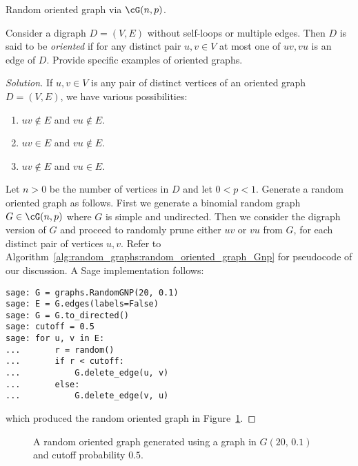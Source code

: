 \begin{algorithm}[!htbp]

\caption{Random oriented graph via $\cG(n,p)$.}
\label{alg:random_graphs:random_oriented_graph_Gnp}
\end{algorithm}

\begin{example}
\label{eg:random_graphs:random_oriented_graph}
Consider a digraph $D = (V,E)$ without self-loops or multiple
edges. Then $D$ is said to be \emph{oriented} if
for any distinct pair $u,v \in V$ at most one of $uv, vu$ is an edge
of $D$. Provide specific examples of oriented graphs.
\end{example}

\begin{proof}[Solution]
If $u,v \in V$ is any pair of distinct vertices of an oriented graph
$D = (V,E)$, we have various possibilities:
\begin{enumerate}
\item $uv \notin E$ and $vu \notin E$.

\item $uv \in E$ and $vu \notin E$.

\item $uv \notin E$ and $vu \in E$.
\end{enumerate}
Let $n > 0$ be the number of vertices in $D$ and let
$0 < p < 1$. Generate a random oriented graph as follows. First we
generate a binomial random graph $G \in \cG(n,p)$ where $G$ is simple
and undirected. Then we consider the digraph version of $G$ and
proceed to randomly prune either $uv$ or $vu$ from $G$, for each
distinct pair of vertices $u,v$. Refer to
Algorithm~\ref{alg:random_graphs:random_oriented_graph_Gnp} for
pseudocode of our discussion. A Sage implementation follows:
\begin{lstlisting}
sage: G = graphs.RandomGNP(20, 0.1)
sage: E = G.edges(labels=False)
sage: G = G.to_directed()
sage: cutoff = 0.5
sage: for u, v in E:
...       r = random()
...       if r < cutoff:
...           G.delete_edge(u, v)
...       else:
...           G.delete_edge(v, u)
\end{lstlisting}
which produced the random oriented graph in
Figure~\ref{fig:random_graphs:random_oriented_graph}.
\end{proof}

\begin{figure}[!htbp]
\centering
{}

\caption{A random oriented graph generated using a graph in
  $G(20,\, 0.1)$ and cutoff probability $0.5$.}
\label{fig:random_graphs:random_oriented_graph}
\end{figure}

